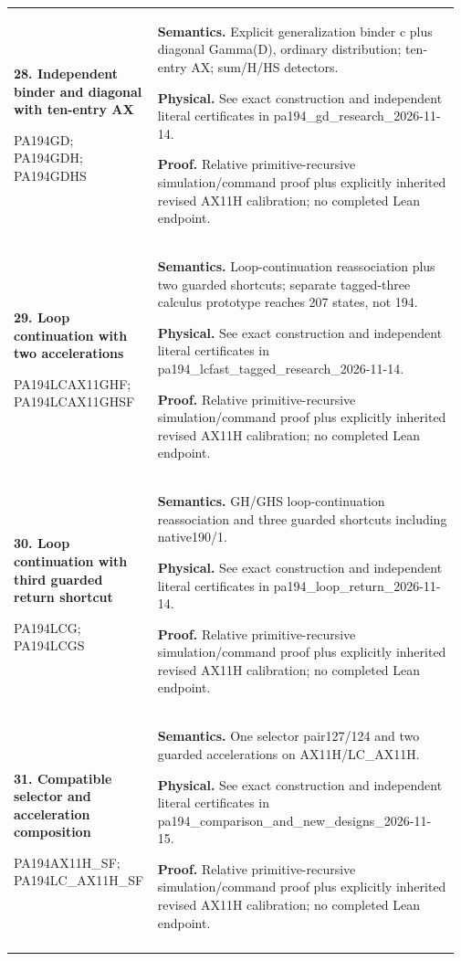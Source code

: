 \begin{longtable}{@{}>{\raggedright\arraybackslash}p{0.295\linewidth}>{\raggedright\arraybackslash}p{0.675\linewidth}@{}}
\textbf{28. Independent binder and diagonal with ten-entry AX}\par PA194GD; PA194GDH; PA194GDHS & \textbf{Semantics.} Explicit generalization binder c plus diagonal Gamma(D), ordinary distribution; ten-entry AX; sum/H/HS detectors.\par\textbf{Physical.} See exact construction and independent literal certificates in pa194\_\allowbreak{}gd\_\allowbreak{}research\_\allowbreak{}2026-11-14.\par\textbf{Proof.} Relative primitive-recursive simulation/command proof plus explicitly inherited revised AX11H calibration; no completed Lean endpoint.\\\addlinespace[6pt]
\textbf{29. Loop continuation with two accelerations}\par PA194LCAX11GHF; PA194LCAX11GHSF & \textbf{Semantics.} Loop-continuation reassociation plus two guarded shortcuts; separate tagged-three calculus prototype reaches 207 states, not 194.\par\textbf{Physical.} See exact construction and independent literal certificates in pa194\_\allowbreak{}lcfast\_\allowbreak{}tagged\_\allowbreak{}research\_\allowbreak{}2026-11-14.\par\textbf{Proof.} Relative primitive-recursive simulation/command proof plus explicitly inherited revised AX11H calibration; no completed Lean endpoint.\\\addlinespace[6pt]
\textbf{30. Loop continuation with third guarded return shortcut}\par PA194LCG; PA194LCGS & \textbf{Semantics.} GH/GHS loop-continuation reassociation and three guarded shortcuts including native190/1.\par\textbf{Physical.} See exact construction and independent literal certificates in pa194\_\allowbreak{}loop\_\allowbreak{}return\_\allowbreak{}2026-11-14.\par\textbf{Proof.} Relative primitive-recursive simulation/command proof plus explicitly inherited revised AX11H calibration; no completed Lean endpoint.\\\addlinespace[6pt]
\textbf{31. Compatible selector and acceleration composition}\par PA194AX11H\_\allowbreak{}SF; PA194LC\_\allowbreak{}AX11H\_\allowbreak{}SF & \textbf{Semantics.} One selector pair127/124 and two guarded accelerations on AX11H/LC\_\allowbreak{}AX11H.\par\textbf{Physical.} See exact construction and independent literal certificates in pa194\_\allowbreak{}comparison\_\allowbreak{}and\_\allowbreak{}new\_\allowbreak{}designs\_\allowbreak{}2026-11-15.\par\textbf{Proof.} Relative primitive-recursive simulation/command proof plus explicitly inherited revised AX11H calibration; no completed Lean endpoint.\\\addlinespace[6pt]

\end{longtable}
